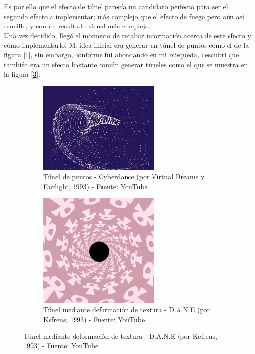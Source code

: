 Es por ello que el efecto de túnel parecía un candidato perfecto para ser el segundo efecto a implementar; más complejo que el efecto de fuego pero aún así sencillo, y con un resultado visual más complejo.\\

Una vez decidido, llegó el momento de recabar información acerca de este efecto y cómo implementarlo. Mi idea inicial era generar un túnel de puntos como el de la figura [\ref{fig:cyberdance}], sin embargo, conforme fui ahondando en mi búsqueda, descubrí que también era un efecto bastante común generar túneles como el que se muestra en la figura [\ref{fig:dane_kefrens}].\\ 

\begin{figure}[h]
	\centering
	\begin{subfigure}[b]{0.45\textwidth}
		\centering
		\includegraphics[width=6cm]{archivos/cyberdance}
		\caption{Túnel de puntos - Cyberdance (por Virtual Dreams y Fairlight, 1993) - Fuente: \href{https://www.youtube.com/watch?v=X7sHODKip_c}{YouTube}}
		\label{fig:cyberdance}
	\end{subfigure}
	\begin{subfigure}[b]{0.45\textwidth}
		\centering
		\includegraphics[width=6cm]{archivos/dane_kefrens}
		\caption{Túnel mediante deformación de textura - D.A.N.E (por Kefrens, 1993) - Fuente: \href{https://www.youtube.com/watch?v=ZbPGU5p7O4Y}{YouTube}}
		\label{fig:dane_kefrens}
	\end{subfigure}
\end{figure}

